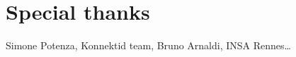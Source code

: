\section{Special thanks}
\label{sec:thanks}

Simone Potenza, Konnektid team, Bruno Arnaldi, INSA Rennes\ldots
